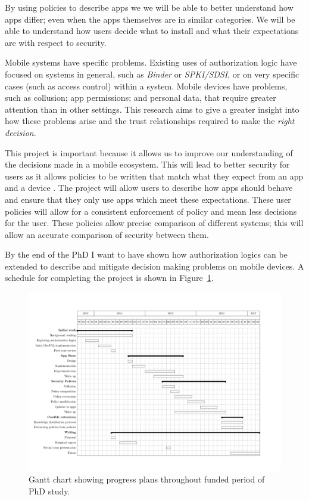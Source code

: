 \documentclass[a4paper]{article}
\begin{document}
By using policies to describe apps we we will be able to better understand how
apps differ; even when the apps themselves are in similar categories.  We will
be able to understand how users decide what to install and what their
expectations are with respect to security.

Mobile systems have specific problems.  Existing uses of authorization logic
have focused on systems in general, such as \emph{Binder} or \emph{SPKI/SDSI},
or on very specific cases (such as access control) within a system.  Mobile
devices have problems, such as collusion; app permissions; and personal data,
that require greater attention than in other settings.  This research aims to give
a greater insight into how these problems arise and the trust relationships
required to make the \emph{right decision}.


This project is important because it allows us to improve our understanding of
the decisions made in a mobile ecosystem.  This will lead to better security for users as it allows
policies to be written that match what they expect from an app and a device .
The project will allow users to describe how apps should
behave and ensure that they only use apps which meet these expectations.  These
user policies will allow for a consistent
enforcement of policy and mean less decisions for the user.  These policies allow
precise comparison of different systems; this will allow an accurate comparison
of security between them.

By the end of the PhD I want to have shown how authorization logics can be
extended to describe and mitigate decision making problems on mobile devices.
A schedule for completing the project is shown in Figure~\ref{fig:gantt}.

\vfill
\begin{figure}
  \includegraphics[width=1.3\linewidth,angle=90]{gantt.pdf}
  \caption{Gantt chart showing progress plans throughout funded period of PhD
  study.}\label{fig:gantt}
\end{figure}
\pagebreak


\appendix

\end{document}
